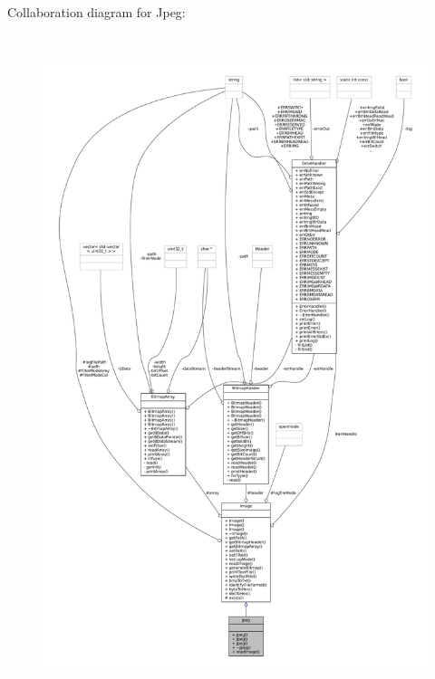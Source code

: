 Collaboration diagram for Jpeg\+:
\nopagebreak
\begin{figure}[H]
\begin{center}
\leavevmode
\includegraphics[height=550pt]{classJpeg__coll__graph}
\end{center}
\end{figure}
